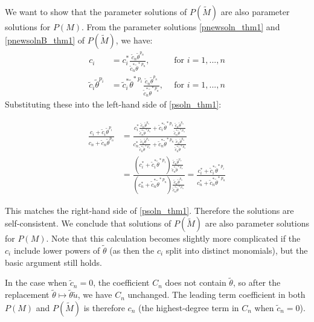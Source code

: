 \documentclass[a4paper,fleqn]{cas-dc}
\theoremstyle{definition}
\begin{document}
\begin{pf}
    We want to show that the parameter solutions of $P(\tilde{M})$ are also parameter solutions for $P(M).$
    From the parameter solutions \cref{pnewsoln_thm1} and \cref{pnewsolnB_thm1} of $P(\tilde{M})$, we have:
    \begin{align*}
        c_i & = c^*_i \frac{\tilde{c}_n \tilde{\theta}^{p_n}}{\tilde{c}_n^* \tilde{\theta}^{*~p_n}}, & ~~\text{for~}i=1,...,n \\
        \tilde{c}_i \tilde{\theta}^{p_i} & = \tilde{c}_i^* \tilde{\theta}^{*~p_i} \frac{\tilde{c}_n \tilde{\theta}^{p_n}}{\tilde{c}_n^* \tilde{\theta}^{*~p_n}}, & ~~\text{for~}i=1,...,n
    \end{align*}
    Substituting these into the left-hand side of \cref{psoln_thm1}:
    \begin{fleqn}
    \begin{align*}
        \frac{c_i + \tilde{c}_i \tilde{\theta}^{p_i}}{c_n + \tilde{c}_n \tilde{\theta}^{p_n}} &= \frac{c^*_i \frac{\tilde{c}_n \tilde{\theta}^{p_n}}{\tilde{c}_n^* \tilde{\theta}^{*~p_n}} + \tilde{c}_i^* \tilde{\theta}^{*~p_i} \frac{\tilde{c}_n \tilde{\theta}^{p_n}}{\tilde{c}_n^* \tilde{\theta}^{*~p_n}}}{c_n^* \frac{\tilde{c}_n \tilde{\theta}^{p_n}}{\tilde{c}_n^* \tilde{\theta}^{*~p_n}} + \tilde{c}_n^* \tilde{\theta}^{*~p_n} \frac{\tilde{c}_n \tilde{\theta}^{p_n}}{\tilde{c}_n^* \tilde{\theta}^{*~p_n}}} \\
        &= \frac{(c^*_i + \tilde{c}_i^* \tilde{\theta}^{*~p_i}) \frac{\tilde{c}_n \tilde{\theta}^{p_n}}{\tilde{c}_n^* \tilde{\theta}^{*~p_n}}}{(c_n^* + \tilde{c}_n^* \tilde{\theta}^{*~p_n}) \frac{\tilde{c}_n \tilde{\theta}^{p_n}}{\tilde{c}_n^* \tilde{\theta}^{*~p_n}}} = \frac{c^*_i + \tilde{c}_i^* \tilde{\theta}^{*~p_i}}{c_n^* + \tilde{c}_n^* \tilde{\theta}^{*~p_n}}
    \end{align*}
    \end{fleqn}
    This matches the right-hand side of \cref{psoln_thm1}. Therefore the solutions are self-consistent.
    We conclude that solutions of $P(\tilde{M})$ are also parameter solutions for $P(M)$. Note that this calculation becomes slightly more complicated if the $c_i$ include lower powers of $\tilde{\theta}$ (as then the $c_i$ split into distinct monomials), but the basic argument still holds. 
    
    In the case when $\tilde{c}_n = 0$, the coefficient $C_n$ does not contain $\tilde{\theta}$, so after the replacement $\tilde{\theta} \mapsto \tilde{\theta}\tilde{u}$, we have $C_n$ unchanged. The leading term coefficient in both $P(M)$ and $P(\tilde{M})$ is therefore $c_n$ (the highest-degree term in $C_n$ when $\tilde{c}_n = 0$).


\end{pf}
\end{document}
